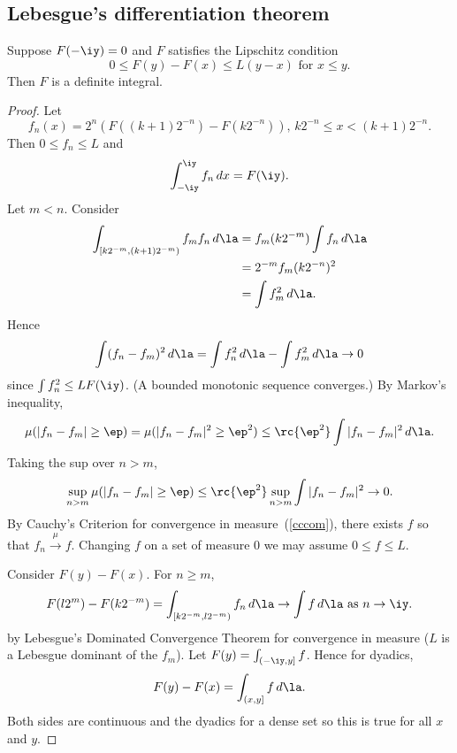 
\subsection{Lebesgue's differentiation theorem}

\begin{lem}\label{lipint}
Suppose $F(-\iy)=0$ and $F$ satisfies the Lipschitz condition 
\[0\le F(y)-F(x)\le L(y-x)\text{ for }x\le y.\]
Then $F$ is a definite integral.
\end{lem}

\begin{proof}
Let
\[
f_n(x)=2^n(F((k+1)2^{-n})-F(k2^{-n})), \,k2^{-n}\le x<(k+1)2^{-n}.
\]
Then $0\le f_n\le L$ and
\[
\int_{-\iy}^{\iy} f_n\,dx=F(\iy).
\]
Let $m<n$. %
Consider
\begin{align*}
\int_{[k2^{-m}, (k+1)2^{-m})} f_m f_n\,d\la
&=f_m(k2^{-m})\int f_n\,d\la\\
&=2^{-m} f_m(k2^{-n})^2 \\
&=\int f_m^2\,d\la.
\end{align*}
Hence
\[
\int (f_n-f_m)^2\,d\la=\int f_n^2\,d\la-\int f_m^2\,d\la\to 0
\]
since $\int f_n^2\le LF(\iy)$. (A bounded monotonic sequence converges.) By Markov's inequality,
\[
\mu(|f_n-f_m|\ge\ep)=\mu(|f_n-f_m|^2\ge\ep^2)\le \rc{\ep^2}\int |f_n-f_m|^2\,d\la.
\]
Taking the sup over $n>m$, 
\[
\sup_{n>m}\mu(|f_n-f_m|\ge \ep)\le \rc{\ep^2}\sup_{n>m}\int |f_n-f_m|^2\to 0.
\]
By Cauchy's Criterion for convergence in measure~(\ref{cccom}), there exists $f$ so that $f_n\xrightarrow{\mu} f$. 
Changing $f$ on a set of measure 0 we may assume $0\le f\le L$. 

Consider $F(y)-F(x)$. For $n\ge m$,
\[
F(l2^m)-F(k2^{-m})=\int_{[k2^{-m}, l2^{-m})} f_n\,d\la
\to\int f\,d\la\text{ as }n\to\iy.
\]
by Lebesgue's Dominated Convergence Theorem for convergence in measure ($L$ is a Lebesgue dominant of the $f_m$). Let $F(y)=\int_{(-\iy,y]}f$. Hence for dyadics,
\[
F(y)-F(x)=\int_{(x,y]} f\,d\la.
\]
Both sides are continuous and the dyadics for a dense set so this is true for all $x$ and $y$.
\end{proof}

